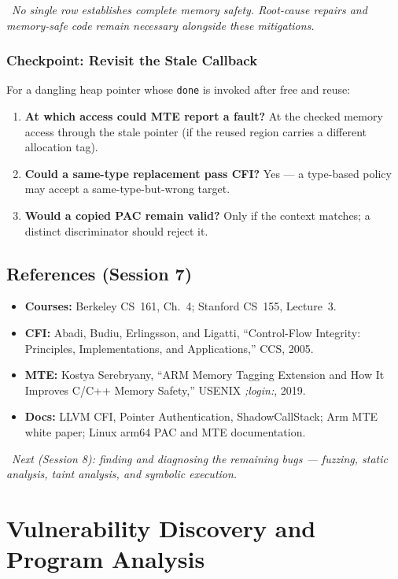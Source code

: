 \documentclass[hidelinks]{article}
\newcommand{\callout}[1]{\par\smallskip\noindent{\color{capri}$\blacktriangleright$}\ \textit{#1}\par\smallskip}
\begin{document}
\callout{No single row establishes complete memory safety. Root-cause repairs and memory-safe code remain necessary alongside these mitigations.}

\subsubsection{Checkpoint: Revisit the Stale Callback}

For a dangling heap pointer whose \texttt{done} is invoked after free and reuse:
\begin{enumerate}
    \item \textbf{At which access could MTE report a fault?} At the checked memory access through the stale pointer (if the reused region carries a different allocation tag).
    \item \textbf{Could a same-type replacement pass CFI?} Yes --- a type-based policy may accept a same-type-but-wrong target.
    \item \textbf{Would a copied PAC remain valid?} Only if the context matches; a distinct discriminator should reject it.
\end{enumerate}

\subsection{References (Session 7)}

\begin{itemize}
    \item \textbf{Courses:} Berkeley CS~161, Ch.~4; Stanford CS~155, Lecture~3.
    \item \textbf{CFI:} Abadi, Budiu, Erlingsson, and Ligatti, ``Control-Flow Integrity: Principles, Implementations, and Applications,'' CCS, 2005.
    \item \textbf{MTE:} Kostya Serebryany, ``ARM Memory Tagging Extension and How It Improves C/C++ Memory Safety,'' USENIX \textit{;login:}, 2019.
    \item \textbf{Docs:} LLVM CFI, Pointer Authentication, ShadowCallStack; Arm MTE white paper; Linux arm64 PAC and MTE documentation.
\end{itemize}

\callout{Next (Session 8): finding and diagnosing the remaining bugs --- fuzzing, static analysis, taint analysis, and symbolic execution.}

\newpage
\section{Vulnerability Discovery and Program Analysis}
\end{document}
